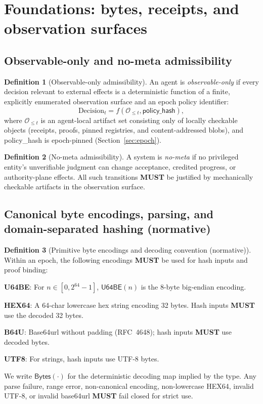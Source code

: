 \documentclass[11pt]{article}
\newcommand{\MUST}{\textbf{MUST}}
\newcommand{\term}[1]{\emph{#1}}
\newcommand{\1}{\mathbf{1}}
\theoremstyle{definition}
\newtheorem{definition}{Definition}
\theoremstyle{plain}
\begin{document}
\section{Foundations: bytes, receipts, and observation surfaces}

\subsection{Observable-only and no-meta admissibility}

\begin{definition}[Observable-only admissibility]
An agent is \term{observable-only} if every decision relevant to external effects is a deterministic function of a finite, explicitly enumerated observation surface and an epoch policy identifier:
\[
\text{Decision}_t = f(\mathcal{O}_{\le t}, \textsf{policy\_hash}),
\]
where $\mathcal{O}_{\le t}$ is an agent-local artifact set consisting only of locally checkable objects (receipts, proofs, pinned registries, and content-addressed blobs), and \textsf{policy\_hash} is epoch-pinned (Section~\ref{sec:epoch}).
\end{definition}

\begin{definition}[No-meta admissibility]
A system is \term{no-meta} if no privileged entity's unverifiable judgment can change acceptance, credited progress, or authority-plane effects. All such transitions \MUST{} be justified by mechanically checkable artifacts in the observation surface.
\end{definition}

\subsection{Canonical byte encodings, parsing, and domain-separated hashing (normative)}

\begin{definition}[Primitive byte encodings and decoding convention (normative)]
\label{def:bytes}
Within an epoch, the following encodings \MUST{} be used for hash inputs and proof binding:
\begin{tightitemize}
\item \textbf{U64BE}: For $n\in[0,2^{64}-1]$, $\mathsf{U64BE}(n)$ is the 8-byte big-endian encoding.
\item \textbf{HEX64}: A 64-char lowercase hex string encoding 32 bytes. Hash inputs \MUST{} use the decoded 32 bytes.
\item \textbf{B64U}: Base64url without padding (RFC~4648); hash inputs \MUST{} use decoded bytes.
\item \textbf{UTF8}: For strings, hash inputs use UTF-8 bytes.
\end{tightitemize}
We write $\mathsf{Bytes}(\cdot)$ for the deterministic decoding map implied by the type. Any parse failure, range error, non-canonical encoding, non-lowercase HEX64, invalid UTF-8, or invalid base64url \MUST{} fail closed for strict use.
\end{definition}
\end{document}
